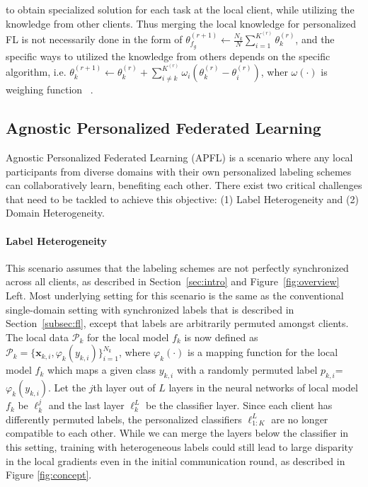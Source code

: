 to obtain specialized solution for each task at the local client, while utilizing the knowledge from other clients. Thus merging the local knowledge for personalized FL is not necessarily done in the form of $\theta^{(r+1)}_{f_g} \leftarrow \frac{N_{k}}{N}\sum_{i=1}^{K^{(r)}} \theta_{k}^{(r)}$, and the specific ways to utilized the knowledge from others depends on the specific algorithm, i.e. $\theta^{(r+1)}_k\leftarrow \theta^{(r)}_k + \sum_{i\neq k}^{K^{(r)}} \omega_i(\theta_{k}^{(r)}-\theta_{i}^{(r)})$, wher $\omega(\cdot)$ is weighing function ~\citep{zhang2021personalized}.






\subsection{Agnostic Personalized Federated Learning}
\label{subsec:apfl}

Agnostic Personalized Federated Learning (APFL) is a scenario where any local participants from diverse domains with their own personalized labeling schemes can collaboratively learn, benefiting each other. There exist two critical challenges that need to be tackled to achieve this objective: (1) Label Heterogeneity and (2) Domain Heterogeneity.

\vspace{-0.125in}
\paragraph{Label Heterogeneity } This scenario assumes that the labeling schemes are not perfectly synchronized across all clients, as described in Section~\ref{sec:intro} and Figure~\ref{fig:overview} Left. Most underlying setting for this scenario is the same as the conventional single-domain setting with synchronized labels that is described in Section~\ref{subsec:fl}, except that labels are arbitrarily permuted amongst clients. The local data $\mathcal{P}_{k}$ for the local model $f_k$ is now defined as $\mathcal{P}_{k}=\{\textbf{x}_{k,i}, \varphi_{k}(y_{k,i})\}^{N_{k}}_{i=1}$, where $\varphi_{k}(\cdot)$ is a mapping function for the local model $f_k$ which maps a given class $y_{k,i}$ with a randomly permuted label $p_{k,i}$=$\varphi_{k}(y_{k,i})$. Let the $j$th layer out of $L$ layers in the neural networks of local model $f_k$ be $\ell_{k}^{j}$ and the last layer $\ell_{k}^L$ be the classifier layer. Since each client has differently permuted labels, the personalized classifiers $\ell_{1:K}^{L}$ are no longer compatible to each other. While we can merge the layers below the classifier in this setting, training with heterogeneous labels could still lead to large disparity in the local gradients even in the initial communication round, as described in Figure \ref{fig:concept}.


